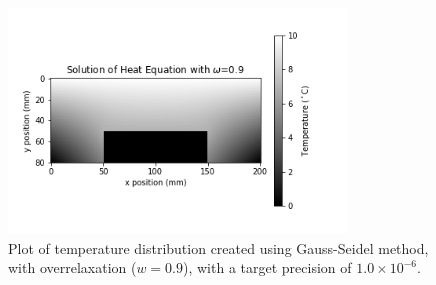 \documentclass{article}
\begin{document}
\begin{figure}[H]
	\centering
	\includegraphics[width=0.8\textwidth]{../images/q1_c.png}
	\caption{Plot of temperature distribution created using Gauss-Seidel method, with overrelaxation ($w=0.9$), with a target precision of $1.0\times 10^{-6}$.}
	\label{fig:1c}
\end{figure}
\end{document}
